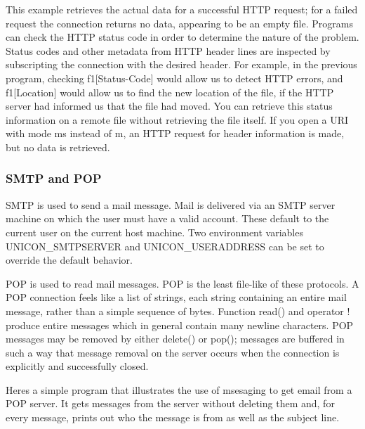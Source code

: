 This example retrieves the actual data for a successful HTTP request;
for a failed request the connection returns no data, appearing to be an
empty file. Programs can check the HTTP status code in order to
determine the nature of the problem. Status codes and other metadata
from HTTP header lines are inspected by subscripting the connection
with the desired header. For example, in the previous program, checking
\textsf{f1[{\textquotedbl}Status-Code{\textquotedbl}]} would allow us
to detect HTTP errors, and
\textsf{f1[{\textquotedbl}Location{\textquotedbl}]} would allow us to
find the new location of the file, if the HTTP server had informed us
that the file had moved. You can retrieve this status information on a
remote file without retrieving the file itself. If you open a URI with
mode \textsf{{\textquotedbl}ms{\textquotedbl}} instead of
\textsf{{\textquotedbl}m{\textquotedbl}}, an HTTP request for header
information is made, but no data is retrieved.

\subsubsection{SMTP and POP}
SMTP is used to send a mail message. Mail is delivered via
an SMTP server machine on which the user must have a valid account.
These default to the current user on the current host machine. Two
environment variables UNICON\_SMTPSERVER and UNICON\_USERADDRESS can be
set to override the default behavior.

POP is used to read mail messages. POP is the least file-like
of these protocols. A POP connection feels like a list of strings, each
string containing an entire mail message, rather than a simple sequence
of bytes. Function \textsf{read()} and operator \textsf{!} produce
entire messages which in general contain many newline characters. POP
messages may be removed by either \textsf{delete()} or \textsf{pop()};
messages are buffered in such a way that message removal on the server
occurs when the connection is explicitly and successfully closed.

Here{\textquotesingle}s a simple program that illustrates the use of
msesaging to get email from a POP server. It gets messages from the
server without deleting them and, for every message, prints out who the
message is from as well as the subject line.


